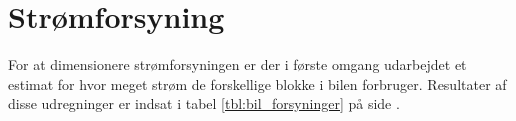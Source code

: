 \section{Strømforsyning}

For at dimensionere strømforsyningen er der i første omgang udarbejdet et estimat for hvor meget strøm de forskellige blokke i bilen forbruger. Resultater af disse udregninger er indsat i tabel \ref{tbl:bil_forsyninger} på side \pageref{tbl:bil_forsyninger}.

